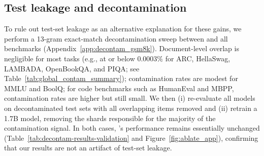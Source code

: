 \subsection{Test leakage and decontamination}
\label{sec:exp_contam}
To rule out test-set leakage as an alternative explanation for these gains, we perform a 13-gram exact-match decontamination sweep between \MixtureVitae{} and all benchmarks
(Appendix~\ref{app:decontam_gsm8k}). Document-level overlap is negligible for most tasks (e.g., at or below
$0.0003\%$ for ARC, HellaSwag, LAMBADA, OpenBookQA, and PIQA; see Table~\ref{tab:global_contam_summary}); contamination rates are modest for MMLU and BoolQ; for code benchmarks such as HumanEval and MBPP, contamination rates are higher but still small. We then (i) re-evaluate all models on decontaminated test sets with all overlapping items removed and (ii) retrain a 1.7B model, removing the shards responsible for the majority of the contamination signal. In both cases, \MixtureVitae{}’s performance
remains essentially unchanged (Table~\ref{tab:decontam-results-validation} and Figure~\ref{fig:ablate_app}), confirming that our results are not an artifact of test-set leakage.